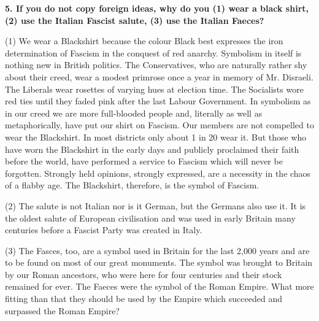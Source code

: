 \documentclass{book}
\begin{document}
\begin{flushright}
\textbf{5. If you do not copy foreign ideas, why do you (1) wear a black shirt, (2) use the Italian
    Fascist salute, (3) use the Italian Faeces?}

(1) We wear a Blackshirt because the colour Black best expresses the iron determination of
Fascism in the conquest of red anarchy. Symbolism in itself is nothing new in British politics.
The Conservatives, who are naturally rather shy about their creed, wear a modest primrose once
a year in memory of Mr. Disraeli. The Liberals wear rosettes of varying hues at election time.
The Socialists wore red ties until they faded pink after the last Labour Government. In
symbolism as in our creed we are more full-blooded people and, literally as well as
metaphorically, have put our shirt on Fascism. Our members are not compelled to wear the
Blackshirt. In most districts only about 1 in 20 wear it. But those who have worn the Blackshirt
in the early days and publicly proclaimed their faith before the world, have performed a service
to Fascism which will never be forgotten. Strongly held opinions, strongly expressed, are a
necessity in the chaos of a flabby age. The Blackshirt, therefore, is the symbol of Fascism.

(2) The salute is not Italian nor is it German, but the Germans also use it. It is the oldest salute of
European civilisation and was used in early Britain many centuries before a Fascist Party was
created in Italy.

(3) The Fasces, too, are a symbol used in Britain for the last 2,000 years and are to be found on
most of our great monuments. The symbol was brought to Britain by our Roman ancestors, who
were here for four centuries and their stock remained for ever. The Faeces were the symbol of the
Roman Empire. What more fitting than that they should be used by the Empire which succeeded and surpassed the Roman Empire?
\end{flushright}
\end{document}
